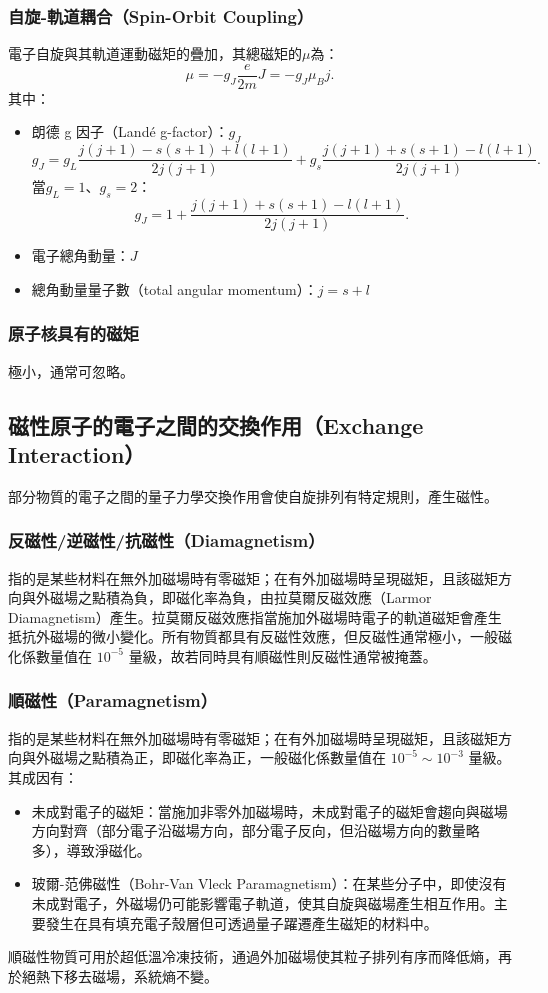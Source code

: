 \documentclass[a4paper,12pt]{report}
\begin{document}
\begin{itemize}
\subsubsection{自旋-軌道耦合（Spin-Orbit Coupling）}
電子自旋與其軌道運動磁矩的疊加，其總磁矩的$\mu$為：
\[\mu=-g_J\frac{e}{2m}J=-g_J\mu_Bj.\]
其中：
\begin{itemize}
\item 朗德 g 因子（Landé g-factor）：$g_J$
\[g_J=g_L\frac{j(j+1)-s(s+1)+l(l+1)}{2j(j+1)}+g_s\frac{j(j+1)+s(s+1)-l(l+1)}{2j(j+1)}.\]
當$g_L=1$、$g_s=2$：
\[g_J=1+\frac{j(j+1)+s(s+1)-l(l+1)}{2j(j+1)}.\]
\item 電子總角動量：$J$
\item 總角動量量子數（total angular momentum）：$j=s+l$
\end{itemize}
\subsubsection{原子核具有的磁矩}
極小，通常可忽略。
\subsection{磁性原子的電子之間的交換作用（Exchange Interaction）}
部分物質的電子之間的量子力學交換作用會使自旋排列有特定規則，產生磁性。
\subsubsection{反磁性/逆磁性/抗磁性（Diamagnetism）}
指的是某些材料在無外加磁場時有零磁矩；在有外加磁場時呈現磁矩，且該磁矩方向與外磁場之點積為負，即磁化率為負，由拉莫爾反磁效應（Larmor Diamagnetism）產生。拉莫爾反磁效應指當施加外磁場時電子的軌道磁矩會產生抵抗外磁場的微小變化。所有物質都具有反磁性效應，但反磁性通常極小，一般磁化係數量值在 $10^{-5}$ 量級，故若同時具有順磁性則反磁性通常被掩蓋。
\subsubsection{順磁性（Paramagnetism）}
指的是某些材料在無外加磁場時有零磁矩；在有外加磁場時呈現磁矩，且該磁矩方向與外磁場之點積為正，即磁化率為正，一般磁化係數量值在 $10^{-5}\sim 10^{-3}$ 量級。其成因有：
\begin{itemize}
\item 未成對電子的磁矩：當施加非零外加磁場時，未成對電子的磁矩會趨向與磁場方向對齊（部分電子沿磁場方向，部分電子反向，但沿磁場方向的數量略多），導致淨磁化。
\item 玻爾-范佛磁性（Bohr-Van Vleck Paramagnetism）：在某些分子中，即使沒有未成對電子，外磁場仍可能影響電子軌道，使其自旋與磁場產生相互作用。主要發生在具有填充電子殼層但可透過量子躍遷產生磁矩的材料中。
\end{itemize}
順磁性物質可用於超低溫冷凍技術，通過外加磁場使其粒子排列有序而降低熵，再於絕熱下移去磁場，系統熵不變。

\end{itemize}
\end{document}
